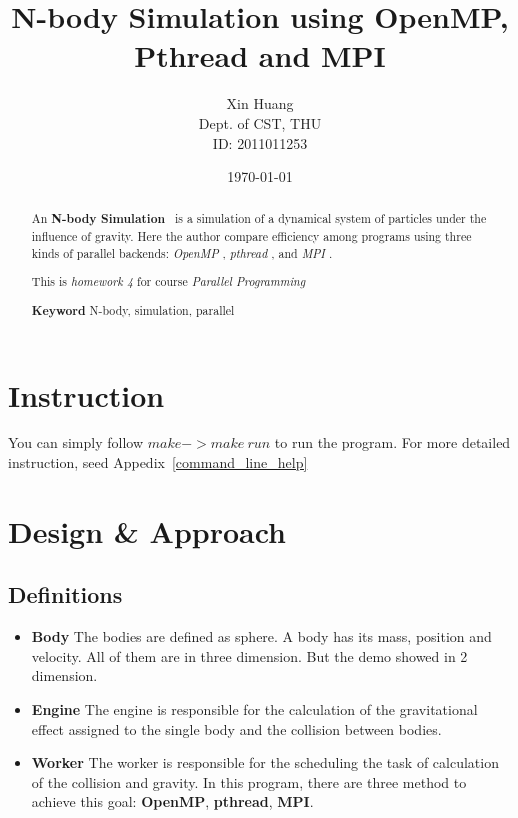 \documentclass{article}
\title{N-body Simulation using OpenMP, Pthread and MPI}
\author{Xin Huang\\ Dept. of CST, THU\\ ID: 2011011253}
\date{\today}
\begin{document}
\maketitle

\newcommand{\nbs}{ {\bf N-body Simulation}  }
\newcommand{\pthread} { {\it pthread} }
\newcommand{\openmp} { {\it OpenMP} }
\newcommand{\mpi} { {\it MPI} }


\begin{abstract}
	An \nbs ~is a simulation of a dynamical system of particles under
	the influence of gravity.\cite{wiki_nbs}
	Here the author compare efficiency among programs using three kinds of
	parallel backends: \openmp, \pthread, and \mpi.

	This is {\it homework 4} for course {\it Parallel Programming}

	{\bf Keyword} N-body, simulation, parallel
\end{abstract}

\tableofcontents

\clearpage

\section{Instruction}
	You can simply follow $make->make~run$ to run the program. For more
	detailed instruction, seed Appedix~\ref{command_line_help}

\section{Design \& Approach}
	\subsection{Definitions}
		\begin{itemize}
			\item {\bf Body}
				The bodies are defined as sphere. A body has its mass, position
				and velocity. All of them are in three dimension. But the demo
				showed in 2 dimension.

			\item {\bf Engine}
				The engine is responsible for the calculation of the gravitational
				effect assigned to the single body and the collision between bodies.

			\item {\bf Worker}
				The worker is responsible for the scheduling the task of calculation
				of the collision and gravity. In this program, there are three
				method to achieve this goal: {\bf OpenMP}, {\bf pthread}, {\bf MPI}.

		\end{itemize}
\end{document}
